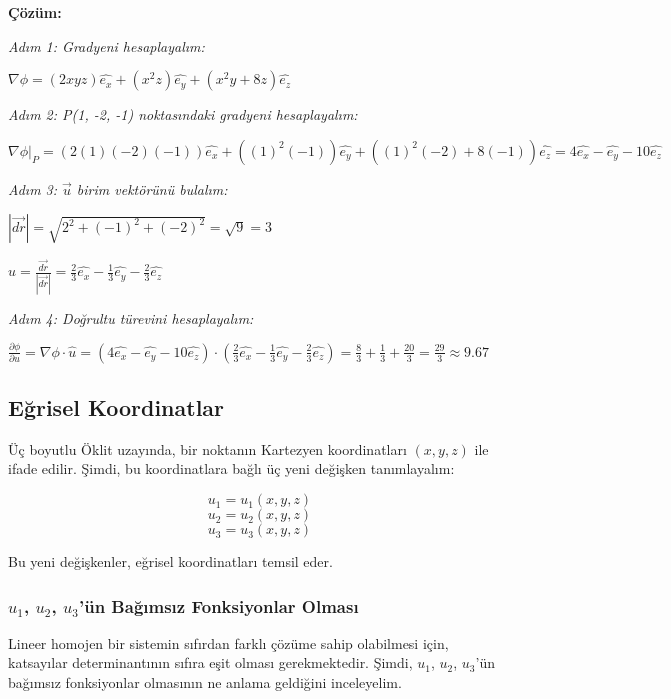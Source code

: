 \documentclass[11pt,letterpaper,twocolumn]{fenbil}
\begin{document}
\textbf{Çözüm:}

\textit{Adım 1: Gradyeni hesaplayalım:}

$\nabla \phi = (2xyz) \hat{e_x} + (x^2z) \hat{e_y} + (x^2y + 8z) \hat{e_z}$

\textit{Adım 2: P(1, -2, -1) noktasındaki gradyeni hesaplayalım:}

$\nabla \phi |_P = (2(1)(-2)(-1)) \hat{e_x} + ((1)^2(-1)) \hat{e_y} + ((1)^2(-2) + 8(-1)) \hat{e_z} = 4 \hat{e_x} - \hat{e_y} - 10 \hat{e_z}$

\textit{Adım 3: $\vec{u}$ birim vektörünü bulalım:}

$|\vec{dr}| = \sqrt{2^2 + (-1)^2 + (-2)^2} = \sqrt{9} = 3$

$\hat{u} = \frac{\vec{dr}}{|\vec{dr}|} = \frac{2}{3} \hat{e_x} - \frac{1}{3} \hat{e_y} - \frac{2}{3} \hat{e_z}$

\textit{Adım 4: Doğrultu türevini hesaplayalım:}

$\frac{\partial \phi}{\partial u} = \nabla \phi \cdot \hat{u} = (4 \hat{e_x} - \hat{e_y} - 10 \hat{e_z}) \cdot (\frac{2}{3} \hat{e_x} - \frac{1}{3} \hat{e_y} - \frac{2}{3} \hat{e_z}) = \frac{8}{3} + \frac{1}{3} + \frac{20}{3} = \frac{29}{3} \approx 9.67$

\subsection{Eğrisel Koordinatlar}

Üç boyutlu Öklit uzayında, bir noktanın Kartezyen koordinatları $(x, y, z)$ ile ifade edilir. Şimdi, bu koordinatlara bağlı üç yeni değişken tanımlayalım:

\begin{equation}
u_1 = u_1(x, y, z)
\end{equation}
\begin{equation}
u_2 = u_2(x, y, z)
\end{equation}
\begin{equation}
u_3 = u_3(x, y, z)
\end{equation}

Bu yeni değişkenler, eğrisel koordinatları temsil eder.

\subsubsection{$u_1$, $u_2$, $u_3$'ün Bağımsız Fonksiyonlar Olması}

Lineer homojen bir sistemin sıfırdan farklı çözüme sahip olabilmesi için, katsayılar determinantının sıfıra eşit olması gerekmektedir. Şimdi, $u_1$, $u_2$, $u_3$'ün bağımsız fonksiyonlar olmasının ne anlama geldiğini inceleyelim.
\end{document}
